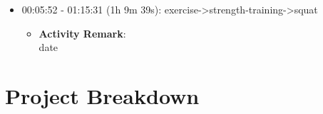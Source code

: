 \documentclass[12pt]{extarticle}
\begin{document}
\begin{itemize}[topsep=0pt, itemsep=-0.5ex]
    \begin{itemize}[topsep=0pt, itemsep=-0.5ex]
        \item \textbf{Activity Remark}:\\
        date\\
cherry
    \end{itemize}
    \item \textcolor{exercisecolor}{00:05:52 - 01:15:31 (1h 9m 39s): exercise->strength-training->squat}
    \begin{itemize}[topsep=0pt, itemsep=-0.5ex]
        \item \textbf{Activity Remark}:\\
        date
    \end{itemize}
\end{itemize}

{\fontsize{16}{19.2}\selectfont\section*{Project Breakdown}}
\end{document}
